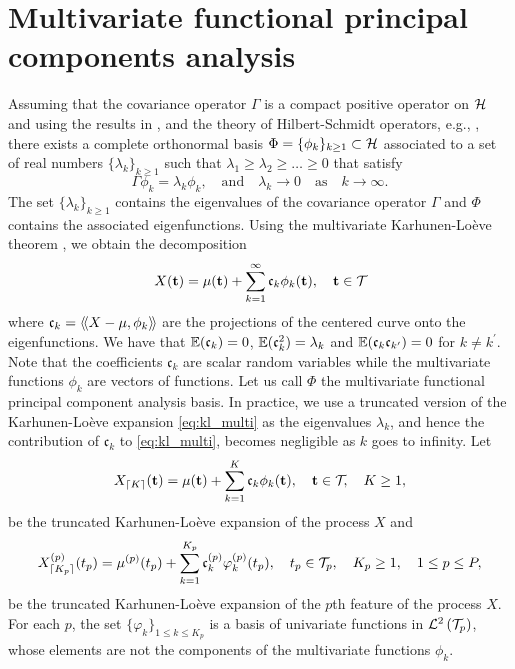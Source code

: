 \section{Multivariate functional principal components analysis} %
\label{sec:functional_principal_components_analysis}

Assuming that the covariance operator $\Gamma$ is a compact positive operator on $\mathcal{H}$ and using the results in \cite{happMultivariateFunctionalPrincipal2018a}, and the theory of Hilbert-Schmidt operators, e.g., \cite{reedMethodsModernMathematical1980}, there exists a complete orthonormal basis 
$\Phi = \{\phi_k\}_{k \geq 1} \subset \mathcal{H}$ associated to a set of real numbers $\{\lambda_k\}_{k \geq 1}$ such that $\lambda_1 \geq \lambda_2 \geq \dots \geq 0$ that satisfy
\begin{equation}\label{eq:eigendecomposition}
    \Gamma \phi_k = \lambda_k \phi_k, \quad\text{and}\quad \lambda_k \longrightarrow 0 \quad\text{as}\quad k \longrightarrow \infty.
\end{equation}
The set $\{\lambda_k\}_{k \geq 1}$ contains the eigenvalues of the covariance operator $\Gamma$ and $\Phi$ contains the associated eigenfunctions. Using the multivariate Karhunen-Loève theorem \citep{happMultivariateFunctionalPrincipal2018a}, we obtain the decomposition
\begin{equation}\label{eq:kl_multi}
    X(\mathbf{t}) = \mu(\mathbf{t}) + \sum_{k = 1}^\infty \mathfrak{c}_k \phi_k(\mathbf{t}), \quad \mathbf{t} \in \mathcal{T}_{}
\end{equation}
where $\mathfrak{c}_{k} = \langle\!\langle X - \mu, \phi_k\rangle\!\rangle$ are the projections of the centered curve onto the eigenfunctions. We have that $\mathbb{E}(\mathfrak{c}_{k}) = 0$, $\mathbb{E}(\mathfrak{c}_{k}^2) = \lambda_k$ and $\mathbb{E}(\mathfrak{c}_{k}\mathfrak{c}_{k^\prime}) = 0$ for $k \neq k^\prime$. Note that the coefficients $\mathfrak{c}_k$ are scalar random variables while the multivariate functions $\phi_k$ are vectors of functions. Let us call $\Phi$ the multivariate functional principal component analysis basis. In practice, we use a truncated version of the Karhunen-Loève expansion \eqref{eq:kl_multi} as the eigenvalues $\lambda_k$, and hence the contribution of $\mathfrak{c}_k$ to \eqref{eq:kl_multi}, becomes negligible as $k$ goes to infinity. Let
\begin{equation}\label{eq:kl_multi_trunc}
    X_{\lceil K \rceil}(\mathbf{t}) = \mu(\mathbf{t}) + \sum_{k = 1}^K \mathfrak{c}_k \phi_k(\mathbf{t}), \quad \mathbf{t} \in \mathcal{T}_{}, \quad K \geq 1,
\end{equation}
be the truncated Karhunen-Loève expansion of the process $X$ and
\begin{equation}\label{eq:kl_multi_trunc_comp}
    X_{\lceil K_p \rceil}^{(p)}(t_p) = \mu^{(p)}(t_p) + \sum_{k = 1}^{K_p} \mathfrak{c}^{(p)}_k \varphi_k^{(p)}(t_p), \quad t_p \in \mathcal{T}_{p}, \quad K_p \geq 1, \quad 1 \leq p \leq P,
\end{equation}
be the truncated Karhunen-Loève expansion of the $p$th feature of the process $X$. For each $p$, the set $\{\varphi_k\}_{1 \leq k \leq K_p}$ is a basis of univariate functions in $\mathcal{L}^{2}\left(\mathcal{T}_{p}\right)$, whose elements are not the components of the multivariate functions $\phi_k$.


